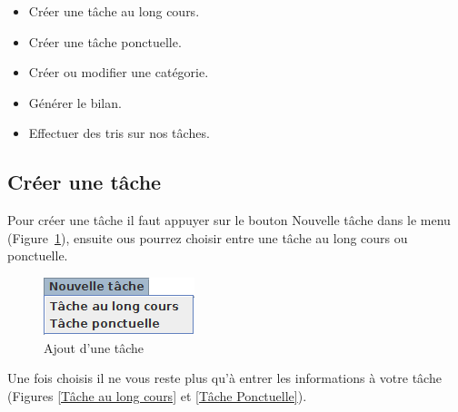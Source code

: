 \documentclass{article}
\begin{document}
\begin{itemize}
	\item Créer une tâche au long cours.
	\item Créer une tâche ponctuelle.
	\item Créer ou modifier une catégorie.
	\item Générer le bilan.
	\item Effectuer des tris sur nos tâches.
\end{itemize}

\subsection{Créer une tâche}
Pour créer une tâche il faut appuyer sur le bouton Nouvelle tâche dans le menu (Figure~\ref{Taches barre}), ensuite ous pourrez choisir entre une tâche au long cours ou ponctuelle.

\begin{figure}
	\centering
	\includegraphics[scale=0.8]{images/MenuTache.png}
	\caption{Ajout d'une tâche}
	\label{Taches barre}
\end{figure}

Une fois choisis il ne vous reste plus qu'à entrer les informations à votre tâche (Figures \ref{Tâche au long cours} et \ref{Tâche Ponctuelle}).
\end{document}
